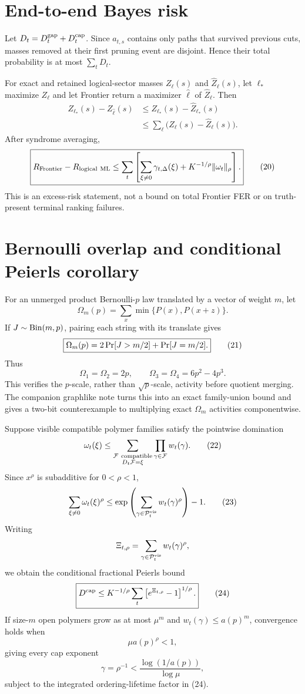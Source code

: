 \documentclass[11pt]{article}
\newcommand{\Prb}{\mathop{\rm Pr}}
\newcommand{\1}{\mathbf 1}
\newcommand{\caploss}{D_t^{\rm cap}}
\newcommand{\gaploss}{D_t^{\rm gap}}
\begin{document}
\section{End-to-end Bayes risk}

Let \(D_t=\gaploss+\caploss\).  Since \(a_{t,s}\) contains only paths that
survived previous cuts, masses removed at their first pruning event are
disjoint.  Hence their total probability is at most \(\sum_tD_t\).

For exact and retained logical-sector masses \(Z_\ell(s)\) and
\(\widehat Z_\ell(s)\), let \(\ell_*\) maximize \(Z_\ell\) and let Frontier
return a maximizer \(\widehat\ell\) of \(\widehat Z_\ell\).  Then
\[
\begin{split}
 Z_{\ell_*}(s)-Z_{\widehat\ell}(s)
 &\le Z_{\ell_*}(s)-\widehat Z_{\ell_*}(s)\\
 &\le\sum_\ell\bigl(Z_\ell(s)-\widehat Z_\ell(s)\bigr).
\end{split}
\]
After syndrome averaging,
\[
\boxed{
 R_{\rm Frontier}-R_{\rm logical\ ML}
 \le\sum_t\left[
 \sum_{\xi\ne0}\gamma_{t,\Delta}(\xi)
 +K^{-1/\rho}\|\omega_t\|_\rho
 \right].}
 \tag{20}
\]
This is an excess-risk statement, not a bound on total Frontier FER or on
truth-present terminal ranking failures.

\section{Bernoulli overlap and conditional Peierls corollary}

For an unmerged product Bernoulli-\(p\) law translated by a vector of weight
\(m\), let
\[
  \Omega_m(p)=\sum_x\min\{P(x),P(x+z)\}.
\]
If \(J\sim{\rm Bin}(m,p)\), pairing each string with its translate gives
\[
\boxed{
  \Omega_m(p)=2\Prb[J>m/2]+\Prb[J=m/2].}
  \tag{21}
\]
Thus
\[
  \Omega_1=\Omega_2=2p,\qquad
  \Omega_3=\Omega_4=6p^2-4p^3.
\]
This verifies the \(p\)-scale, rather than \(\sqrt p\)-scale, activity before
quotient merging.  The companion graphlike note turns this into an exact
family-union bound and gives a two-bit counterexample to multiplying exact
\(\Omega_m\) activities componentwise.

Suppose visible compatible polymer families satisfy the pointwise domination
\[
 \omega_t(\xi)
 \le
 \sum_{\substack{\mathcal F\ {\rm compatible}\\D_t\mathcal F=\xi}}
 \prod_{\gamma\in\mathcal F}w_t(\gamma).
 \tag{22}
\]
Since \(x^\rho\) is subadditive for \(0<\rho<1\),
\[
 \sum_{\xi\ne0}\omega_t(\xi)^\rho
 \le
 \exp\left(
 \sum_{\gamma\in\mathcal P_t^{\rm vis}}w_t(\gamma)^\rho
 \right)-1.
 \tag{23}
\]
Writing
\[
 \Xi_{t,\rho}=
 \sum_{\gamma\in\mathcal P_t^{\rm vis}}w_t(\gamma)^\rho,
\]
we obtain the conditional fractional Peierls bound
\[
\boxed{
 D^{\rm cap}
 \le
 K^{-1/\rho}\sum_t
 \left[e^{\Xi_{t,\rho}}-1\right]^{1/\rho}.}
 \tag{24}
\]
If size-\(m\) open polymers grow as at most \(\mu^m\) and
\(w_t(\gamma)\le a(p)^m\), convergence holds when
\[
 \mu a(p)^\rho<1,
\]
giving every cap exponent
\[
 \gamma=\rho^{-1}
 <\frac{\log(1/a(p))}{\log\mu},
\]
subject to the integrated ordering-lifetime factor in (24).
\end{document}
